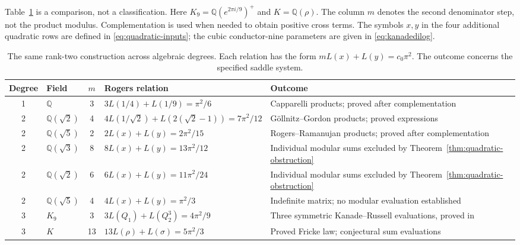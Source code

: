 \documentclass[11pt,reqno]{amsart}
\theoremstyle{remark}
\numberwithin{equation}{section}
\newcommand{\QQ}{\mathbb Q}
\begin{document}
Table~\ref{tab:rogers} is a comparison, not a classification. Here
$K_9=\QQ(e^{2\pi i/9})^+$ and $K=\QQ(\rho)$. The column $m$ denotes
the second denominator step, not the product modulus. Complementation
is used when needed to obtain positive cross terms. The symbols $x,y$
in the four additional quadratic rows are defined in
\eqref{eq:quadratic-inputs}; the cubic conductor-nine parameters are
given in \eqref{eq:kanadedilog}.
\begin{table}[htbp]
\caption{The same rank-two construction across algebraic degrees.
Each relation has the form $mL(x)+L(y)=c_0\pi^2$.
The outcome concerns the specified saddle system.}
\label{tab:rogers}
\centering\small
\renewcommand{\arraystretch}{1.22}
\begin{tabularx}{\textwidth}{@{}clc>{\raggedright\arraybackslash}p{}>{\raggedright\arraybackslash}X@{}}\toprule
Degree&Field&$m$&Rogers relation&Outcome\\\midrule
1&$\QQ$&3&$3L(1/4)+L(1/9)=\pi^2/6$&Capparelli products; proved after complementation\\
2&$\QQ(\sqrt2)$&4&$4L(1/\sqrt2)+L(2(\sqrt2-1))=7\pi^2/12$&G\"ollnitz--Gordon products; proved expressions\\
2&$\QQ(\sqrt5)$&2&$2L(x)+L(y)=2\pi^2/15$&Rogers--Ramanujan products; proved after complementation\\
2&$\QQ(\sqrt3)$&8&$8L(x)+L(y)=13\pi^2/12$&Individual modular sums excluded by Theorem~\ref{thm:quadratic-obstruction}\\
2&$\QQ(\sqrt2)$&6&$6L(x)+L(y)=11\pi^2/24$&Individual modular sums excluded by Theorem~\ref{thm:quadratic-obstruction}\\
2&$\QQ(\sqrt5)$&4&$4L(x)+L(y)=\pi^2/3$&Indefinite matrix; no modular evaluation established\\
3&$K_9$&3&$3L(Q_1)+L(Q_2^3)=4\pi^2/9$&Three symmetric Kanade--Russell evaluations, proved in \cite{MizunoKR,Xia}\\
3&$K$&13&$13L(\rho)+L(\sigma)=5\pi^2/3$&Proved Fricke law; conjectural sum evaluations\\\bottomrule
\end{tabularx}
\end{table}
\end{document}
